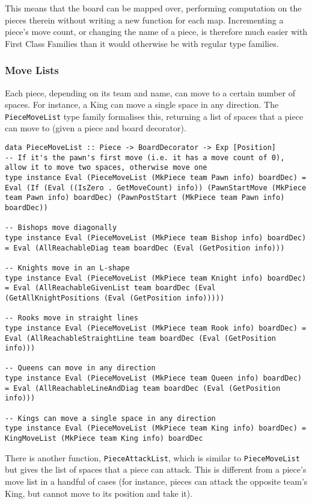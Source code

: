 \documentclass[12pt, a4paper]{scrartcl}
\begin{document}
This means that the board can be mapped over, performing computation on the pieces therein without writing a new function for each map. Incrementing a piece's move count, or changing the name of a piece, is therefore much easier with First Class Families than it would otherwise be with regular type families.

\subsubsection{Move Lists}

Each piece, depending on its team and name, can move to a certain number of spaces. For instance, a King can move a single space in any direction. The \lstinline{PieceMoveList} type family formalises this, returning a list of spaces that a piece can move to (given a piece and board decorator).

\begin{lstlisting}
data PieceMoveList :: Piece -> BoardDecorator -> Exp [Position]
-- If it's the pawn's first move (i.e. it has a move count of 0), allow it to move two spaces, otherwise move one
type instance Eval (PieceMoveList (MkPiece team Pawn info) boardDec) = Eval (If (Eval ((IsZero . GetMoveCount) info)) (PawnStartMove (MkPiece team Pawn info) boardDec) (PawnPostStart (MkPiece team Pawn info) boardDec))

-- Bishops move diagonally
type instance Eval (PieceMoveList (MkPiece team Bishop info) boardDec) = Eval (AllReachableDiag team boardDec (Eval (GetPosition info)))

-- Knights move in an L-shape
type instance Eval (PieceMoveList (MkPiece team Knight info) boardDec) = Eval (AllReachableGivenList team boardDec (Eval (GetAllKnightPositions (Eval (GetPosition info)))))

-- Rooks move in straight lines
type instance Eval (PieceMoveList (MkPiece team Rook info) boardDec) = Eval (AllReachableStraightLine team boardDec (Eval (GetPosition info)))

-- Queens can move in any direction
type instance Eval (PieceMoveList (MkPiece team Queen info) boardDec) = Eval (AllReachableLineAndDiag team boardDec (Eval (GetPosition info)))

-- Kings can move a single space in any direction
type instance Eval (PieceMoveList (MkPiece team King info) boardDec) = KingMoveList (MkPiece team King info) boardDec
\end{lstlisting}

There is another function, \lstinline{PieceAttackList}, which is similar to \lstinline{PieceMoveList} but gives the list of spaces that a piece can attack. This is different from a piece's move list in a handful of cases (for instance, pieces can attack the opposite team's King, but cannot move to its position and take it).
\end{document}
